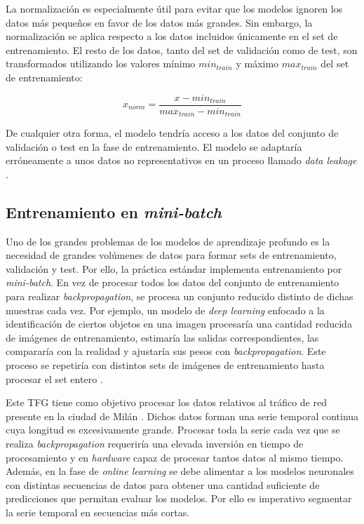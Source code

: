 La normalización es especialmente útil para evitar que los modelos ignoren los datos más pequeños en favor de los datos más grandes. Sin embargo, la normalización se aplica respecto a los datos incluidos únicamente en el set de entrenamiento. El resto de los datos, tanto del set de validación como de test, son transformados utilizando los valores mínimo $min_{train}$ y máximo $max_{train}$ del set de entrenamiento:

\begin{equation}
	x_{norm} = \frac{x-min_{train}}{max_{train}-min_{train}}
\end{equation}

De cualquier otra forma, el modelo tendría acceso a los datos del conjunto de validación o test en la fase de entrenamiento. El modelo se adaptaría erróneamente a unos datos no representativos en un proceso llamado \textit{data leakage} \cite{deeplearning, machinelearningbook}.



\subsection{Entrenamiento en \textit{mini-batch}}
Uno de los grandes problemas de los modelos de aprendizaje profundo es la necesidad de grandes volúmenes de datos para formar sets de entrenamiento, validación y test. Por ello, la práctica estándar implementa entrenamiento por \textit{mini-batch}. En vez de procesar todos los datos del conjunto de entrenamiento para realizar \textit{backpropagation}, se procesa un conjunto reducido distinto de dichas muestras cada vez. Por ejemplo, un modelo de \textit{deep learning} enfocado a la identificación de ciertos objetos en una imagen procesaría una cantidad reducida de imágenes de entrenamiento, estimaría las salidas correspondientes, las compararía con la realidad y ajustaría sus pesos con \textit{backpropagation}. Este proceso se repetiría con distintos sets de imágenes de entrenamiento hasta procesar el set entero \cite{machinelearningbook}.


Este TFG tiene como objetivo procesar los datos relativos al tráfico de red presente en la ciudad de Milán \cite{milandataset}. Dichos datos forman una serie temporal continua cuya longitud es excesivamente grande. Procesar toda la serie cada vez que se realiza \textit{backpropagation} requeriría una elevada inversión en tiempo de procesamiento y en \textit{hardware} capaz de procesar tantos datos al mismo tiempo. Además, en la fase de \textit{online learning} se debe alimentar a los modelos neuronales con distintas secuencias de datos para obtener una cantidad suficiente de predicciones que permitan evaluar los modelos. Por ello es imperativo segmentar la serie temporal en secuencias más cortas.

